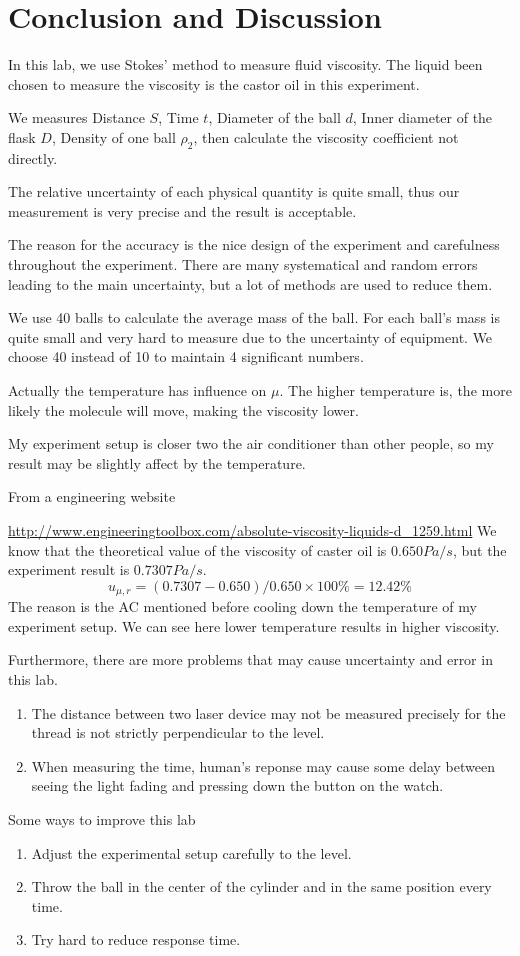 \section{Conclusion and Discussion}

In this lab, we use Stokes’ method to measure fluid viscosity.
The liquid been chosen to measure the viscosity is  the castor oil in this
experiment.

We measures Distance $S$, Time $t$, Diameter of the ball $d$, Inner diameter of
the flask $D$, Density of one ball $\rho_2$, then calculate the viscosity
coefficient not directly.

The relative uncertainty of each physical quantity is quite small, thus our
measurement is very precise and the result is acceptable.

The reason for the accuracy is the nice design of the experiment and carefulness
throughout the experiment.
There are many systematical and random errors leading to the main uncertainty,
but a lot of methods are used to reduce them.

We use 40 balls to calculate the average mass of the ball.
For each ball's mass is quite small and very hard to measure due to the
uncertainty of equipment. We choose 40 instead of 10 to maintain 4 significant
numbers.

Actually the temperature has influence on $\mu$.
The higher temperature is, the more likely the molecule will move, making the
viscosity lower. 

My experiment setup is closer two the air conditioner than other people, so my
result may be slightly affect by the temperature. 

From a engineering website

\url{http://www.engineeringtoolbox.com/absolute-viscosity-liquids-d_1259.html} 
We know that the theoretical value of the viscosity of caster oil is  $0.650
Pa/s$, but the experiment result is $0.7307Pa/s$.
$$ u_{\mu,r} = (0.7307 - 0.650)/ 0.650 \times 100\%  =  12.42 \%   $$ 
The reason is the AC mentioned before cooling down the temperature of my
experiment setup.
We can see here lower temperature results in higher viscosity.


Furthermore, there are more problems that may cause uncertainty and error in this lab.
\begin{enumerate}
\item The distance between two laser device may not be measured precisely for
  the thread is not strictly perpendicular to the level. 
\item When measuring the time, human's reponse may cause some delay between
  seeing the light fading and pressing down the button on the watch. 
\end{enumerate}

Some ways to improve this lab
\begin{enumerate}
\item Adjust the experimental setup carefully to the level.
\item Throw the ball in the center of the cylinder and in the same position
  every time.
\item Try hard to reduce response time.
\end{enumerate}